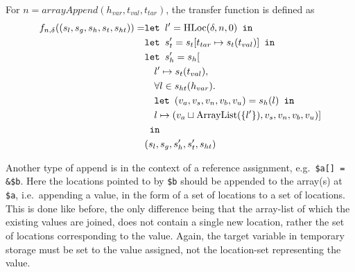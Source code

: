 For $n = \mathit{arrayAppend}(h_{var}, t_{val},t_{tar})$, the transfer function is defined as
\begin{align}
    f_{n,\delta}((s_l, s_g, s_h, s_t, s_{ht})) = &\texttt{let } l' = \text{HLoc}(\delta, n, 0) \texttt{ in } \notag\\
                              &\texttt{let } s_t' = s_t[t_{tar}\mapsto s_t(t_{val})] \texttt{ in }\notag\\
                              &\texttt{let } s_h' = s_h[\notag\\
                              &\quad l' \mapsto s_t(t_{val}), \notag\\
                              &\quad \forall l \in s_{ht}(h_{var}).\notag\\
                              &\quad\texttt{let } (v_a,v_s,v_n,v_b,v_u) = s_h(l) \texttt{ in } \notag\\
                              &\quad l\mapsto (v_a \sqcup \text{ArrayList}(\{l'\}), v_s, v_n, v_b, v_u)]\notag\\
                              & \texttt{ in }\notag\\
                              &(s_l, s_g, s_h', s_t', s_{ht})
\end{align}

Another type of append is in the context of a reference assignment, e.g.\ \texttt{\$a[] = \&\$b}. Here the locations pointed to by \texttt{\$b} should be appended to the array(s) at \texttt{\$a}, i.e.\ appending a value, in the form of a set of locations to a set of locations. This is done like before, the only difference being that the array-list of which the existing values are joined, does not contain a single new location, rather the set of locations corresponding to the value. Again, the target variable in temporary storage must be set to the value assigned, not the location-set representing the value.

